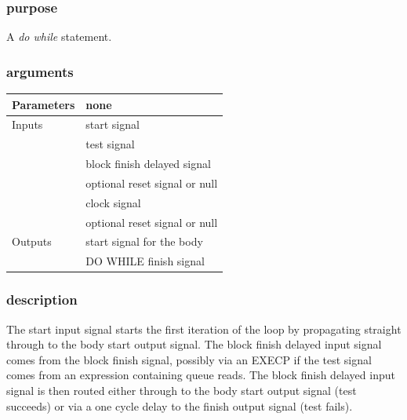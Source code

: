             \subsubsection{purpose}
            
                A {\em do while} statement.

            \subsubsection{arguments}
            
                \begin{tabular}{| l | l |}
                \hline
                Parameters  & none \\
                \hline
                Inputs      & start signal \\
                            & test signal \\
                            & block finish delayed signal \\
                            & optional reset signal or null \\
                            & clock signal \\
                            & optional reset signal or null \\
                \hline
                Outputs     & start signal for the body \\
                            & DO WHILE finish signal \\
                \hline
                \end{tabular}

            \subsubsection{description}

                The start input signal starts the first iteration of the loop by
                propagating straight through to the body start output signal. The
                block finish delayed input signal comes from the block finish
                signal, possibly via an EXECP if the test signal comes from an
                expression containing queue reads. The block finish delayed input
                signal is then routed either through to the body start output
                signal (test succeeds) or via a one cycle delay to the finish
                output signal (test fails).
                
